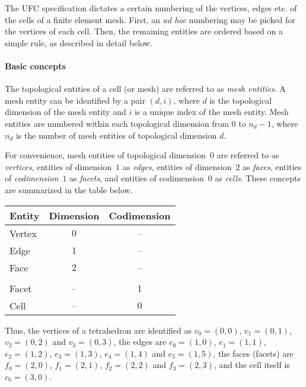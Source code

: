 
The UFC specification dictates a certain numbering of the vertices,
edges etc. of the cells of a finite element mesh. First, an \emph{ad
hoc} numbering may be picked for the vertices of each cell. Then, the
remaining entities are ordered based on a simple rule, as described in
detail below.

\paragraph{Basic concepts}

The topological entities of a cell (or mesh) are referred to as
\emph{mesh entities}. A mesh entity can be identified by a pair $(d,
i)$, where $d$ is the topological dimension of the mesh entity and $i$
is a unique index of the mesh entity. Mesh entities are numbered
within each topological dimension from $0$ to $n_d-1$, where $n_d$ is
the number of mesh entities of topological dimension $d$.

For convenience, mesh entities of topological dimension~$0$ are
referred to as \emph{vertices}, entities of dimension~$1$ as
\emph{edges}, entities of dimension~$2$ as \emph{faces}, entities of
\emph{codimension}~$1$ as \emph{facets}, and entities of codimension~$0$
as \emph{cells}. These concepts are summarized in the table below.

\vspace{0.5cm}
\begin{center}
  \begin{tabular}{lcc} \toprule Entity & Dimension &
    Codimension \\ \hline Vertex & $0$ & -- \\ Edge & $1$ & -- \\ Face
    & $2$ & -- \\ & & \\ Facet & -- & $1$ \\ Cell & -- &
    $0$ \\ \bottomrule \end{tabular}
\end{center}
\vspace{0.5cm}

Thus, the vertices of a tetrahedron are identified as $v_0 = (0, 0)$,
$v_1 = (0, 1)$, $v_2 = (0, 2)$ and $v_3 = (0, 3)$, the edges are $e_0
= (1, 0)$, $e_1 = (1, 1)$, $e_2 = (1, 2)$, $e_3 = (1, 3)$, $e_4 = (1,
4)$ and $e_5 = (1, 5)$, the faces (facets) are $f_0 = (2, 0)$, $f_1 =
(2, 1)$, $f_2 = (2, 2)$ and $f_3 = (2, 3)$, and the cell itself is
$c_0 = (3, 0)$.

